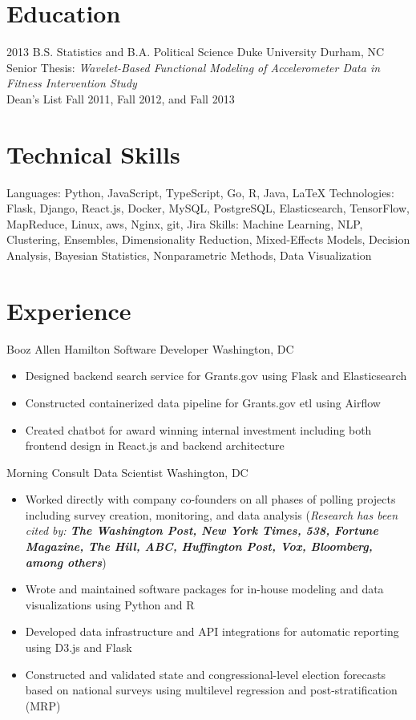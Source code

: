 \documentclass[11pt,a4paper,sans]{moderncv}        %
\begin{document}
\makecvtitle\vspace{-6ex}                          %

\section{Education}
\cventry
	{2013}
	{B.S. Statistics and B.A. Political Science}
	{Duke University}
	{Durham, NC}
	{}
	{Senior Thesis: \textit{Wavelet-Based Functional Modeling of Accelerometer Data in Fitness Intervention Study}
	\\Dean's List Fall 2011, Fall 2012, and Fall 2013}

\section{Technical Skills}
\cvitem
  {Languages:}
  {Python, JavaScript, TypeScript, Go, R, Java, \LaTeX}
\cvitem
  {Technologies:}
  {Flask, Django, React.js, Docker, MySQL, PostgreSQL, Elasticsearch, TensorFlow, MapReduce, Linux, aws, Nginx, git, Jira}
\cvitem
  {Skills:}
  {Machine Learning, NLP, Clustering, Ensembles, Dimensionality Reduction, Mixed-Effects Models, Decision Analysis, Bayesian Statistics, Nonparametric Methods, Data Visualization}

\section{Experience}
  {Booz Allen Hamilton Software Developer}
  {}
  {Washington, DC}
  {}
  {
    \begin{itemize}
		\item{Designed backend search service for Grants.gov using Flask and Elasticsearch}
 		\item{Constructed containerized data pipeline for Grants.gov etl using Airflow}
		\item{Created chatbot for award winning internal investment including both frontend design in React.js and backend architecture}
    \end{itemize}
  }

  {Morning Consult Data Scientist}
  {}
  {Washington, DC}
  {}
  {
    \begin{itemize}
		\item{Worked directly with company co-founders on all phases of polling projects including survey creation, monitoring, and data analysis (\textit{Research has been cited by: \textbf{The Washington Post, New York Times, 538, Fortune Magazine, The Hill, ABC, Huffington Post, Vox, Bloomberg, among others}})}
 		\item{Wrote and maintained software packages for in-house modeling and data visualizations using Python and R}
		\item{Developed data infrastructure and API integrations for automatic reporting using D3.js and Flask}
		\item{Constructed and validated state and congressional-level election forecasts based on national surveys using multilevel regression and post-stratification (MRP)}
    \end{itemize}
  }
\end{document}
